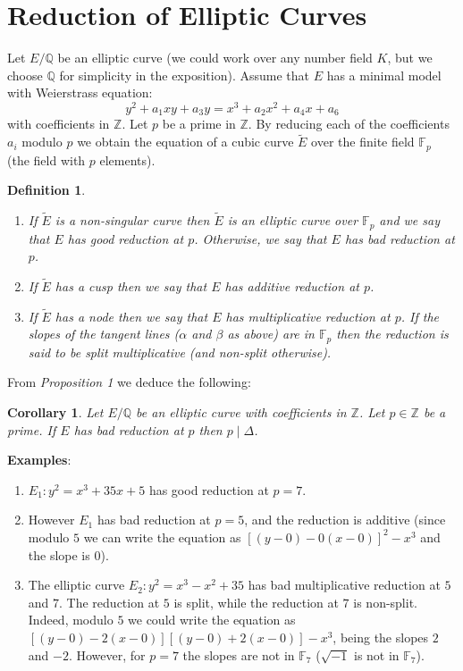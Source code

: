 \documentclass[12pt]{article}
\newtheorem{defn}{Definition}
\newtheorem{cor}{Corollary}
\begin{document}
\section{Reduction of Elliptic Curves}

Let $E/\mathbb{Q}$ be an elliptic curve (we could work over any
number field $K$, but we choose $\mathbb{Q}$ for simplicity in the
exposition). Assume that $E$ has a minimal model with Weierstrass equation:
$$y^2+a_1xy+a_3y=x^3+a_2x^2+a_4x+a_6$$
with coefficients in $\mathbb{Z}$. Let $p$ be a prime in $\mathbb{Z}$. By reducing
each of the coefficients $a_i$ modulo $p$ we obtain the equation
of a cubic curve $\widetilde{E}$ over the finite field
$\mathbb{F}_p$ (the field with $p$ elements).

\begin{defn}\quad
\begin{enumerate}
\item If $\widetilde{E}$ is a non-singular curve then $\widetilde{E}$ is an elliptic curve over $\mathbb{F}_p$ and we say that $E$
has \emph{good reduction} at $p$. Otherwise, we say that $E$ has \emph{bad
reduction} at $p$.

\item If $\widetilde{E}$ has a cusp then we say that $E$ has
\emph{additive reduction} at $p$.

\item If $\widetilde{E}$ has a node then we say that $E$ has
\emph{multiplicative reduction} at $p$. If the slopes of the tangent
lines ($\alpha$ and $\beta$ as above) are in $\mathbb{F}_p$ then
the reduction is said to be \emph{split} multiplicative (and \emph{non-split}
otherwise).
\end{enumerate}
\end{defn}

From \emph{Proposition 1} we deduce the following:
\begin{cor}
Let $E/\mathbb{Q}$ be an elliptic curve with coefficients in
$\mathbb{Z}$. Let $p\in \mathbb{Z}$ be a prime. If $E$ has bad
reduction at $p$ then $p\mid \Delta$.
\end{cor}

{\bf Examples}:
\begin{enumerate}
\item $E_1\colon y^2=x^3+35x+5$ has good reduction at $p=7$.

\item However $E_1$ has bad reduction at $p=5$, and the reduction
is additive (since modulo $5$ we can write the equation as
$[(y-0)-0(x-0)]^2-x^3$ and the slope is $0$).

\item The elliptic curve $E_2\colon y^2=x^3-x^2+35$ has bad
multiplicative reduction at $5$ and $7$. The reduction at $5$ is split,
while the reduction at $7$ is non-split. Indeed, modulo $5$ we could
write the equation as $[(y-0)-2(x-0)][(y-0)+2(x-0)]-x^3$, being
the slopes $2$ and $-2$. However, for $p=7$ the slopes are not in
$\mathbb{F}_7$ ($\sqrt{-1}$ is not in $\mathbb{F}_7$).
\end{enumerate}
\end{document}
